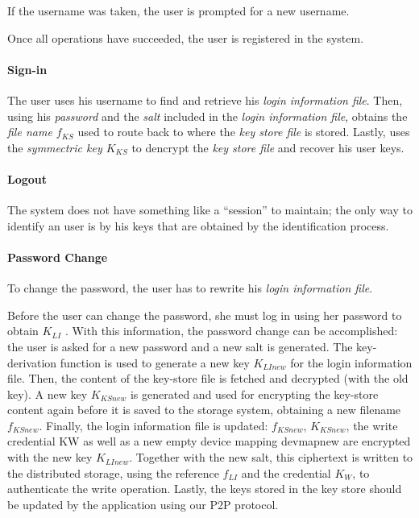 \documentclass[12pt,spanish]{article}
\begin{document}
If the username was taken,
the user is prompted for a new username.

Once all operations
have succeeded, the user is registered in the system.



\paragraph{Sign-in}
The user uses his username to find and retrieve his \textit{login information
file}. Then, using his \textit{password} and the \textit{salt} included in the
\textit{login information file}, obtains the \textit{file name $f_{KS}$} used to
route back to where the \textit{key store file} is stored.  Lastly, uses the
\textit{symmectric key $K_{KS}$} to dencrypt the \textit{key store file} and recover
his user keys.

\paragraph{Logout}
The system does not have something like a ``session'' to maintain; the only way
to identify an user is by his keys that are obtained by the identification
process.


\paragraph{Password Change}
To change the password, the user has to rewrite his \textit{login information
file}.

Before the user can change the password, she must log in using her password to
obtain $K_{LI}$ . With this information, the password change can be accomplished:
the user is asked for a new password and a new salt is
generated. The key-derivation function is used to generate a new key
$K_{LInew}$
for the login information file. Then, the content of the key-store file is
fetched and decrypted (with the old key). A new key $K_{KSnew}$ is generated and
used for encrypting the key-store content again before it is saved to the
storage system, obtaining a new filename $f_{KSnew}$.
Finally, the login information file
is updated: $f_{KSnew}$, $K_{KSnew}$, the write credential KW as well as a new empty
device mapping devmapnew are encrypted with the new key $K_{LInew}$.
  Together with the new salt, this ciphertext is written to the distributed
storage, using the reference $f_{LI}$ and the credential $K_W$, to authenticate the
write operation. Lastly, the keys stored in the key store should be updated by
the application using our P2P protocol.
\end{document}
